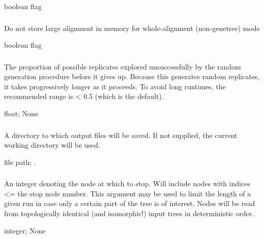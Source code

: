 \documentclass[letterpaper,12pt,english]{sphinxmanual}
\begin{document}
 boolean flag


\subsubsection{}
\label{\detokenize{prog_desc:low-mem}}
 Do not store large alignment in memory for whole-alignment (non-genetree) mode

 boolean flag


\subsubsection{}
\label{\detokenize{prog_desc:max-random-sample-proportion}}
 The proportion of possible replicates explored unsuccessfully by the random generation procedure before it gives up. Because this generates random replicates, it takes progressively longer as it proceeds. To avoid long runtimes, the recommended range is \textless{} 0.5 (which is the default).

 float;  None


\subsubsection{}
\label{\detokenize{prog_desc:o-results-dir}}
 A directory to which output files will be saved. If not supplied, the current working directory will be used.

 file path;  .


\subsubsection{}
\label{\detokenize{prog_desc:p-stop-node-number}}
 An integer denoting the node at which to stop. Will include nodes with indices \textless{}= the stop node number. This argument may be used to limit the length of a given run in case only a certain part of the tree is of interest. Nodes will be read from topologically identical (and isomorphic!) input trees in deterministic order.

 integer;  None
\end{document}
